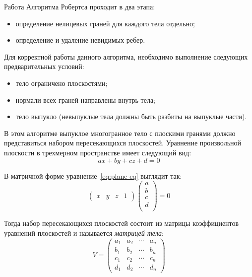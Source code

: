 Работа Алгоритма Робертса проходит в два этапа:
\begin{itemize}[label=--]
	\item определение нелицевых граней для каждого тела отдельно;
	\item определение и удаление невидимых ребер.
\end{itemize}

Для корректной работы данного алгоритма, необходимо выполнение следующих предварительных условий:
\begin{itemize}[label=--]
	\item тело ограничено плоскостями;
	\item нормали всех граней направлены внутрь тела;
	\item тело выпукло (невыпуклые тела должны быть разбиты на выпуклые части).
\end{itemize}

В этом алгоритме выпуклое многогранное тело с плоскими гранями должно представиться набором пересекающихся плоскостей. Уравнение произвольной плоскости в трехмерном пространстве имеет следующий вид:
\begin{equation}
	ax + by + cz + d = 0
	\label{eq:plane-eq}
\end{equation}

В матричной форме уравнение~\ref{eq:plane-eq} выглядит так:
\begin{equation}
	\begin{pmatrix}
		x & y & z & 1
	\end{pmatrix}
	\begin{pmatrix}
		a \\
		b \\
		c \\
		d \\
	\end{pmatrix}
	= 0
	\label{eq:matrix-plane-eq1}
\end{equation}

Тогда набор пересекающихся плоскостей состоит из матрицы коэффициентов уравнений плоскостей и называется \textit{матрицей тела}:
\begin{equation}
	V = 
	\begin{pmatrix}
		a_1 & a_2 & \cdots & a_n \\
		b_1 & b_2 & \cdots & b_n \\
		c_1 & c_2 & \cdots & c_n \\
		d_1 & d_2 & \cdots & d_n
	\end{pmatrix}
	\label{eq:model-matrix}
\end{equation}

